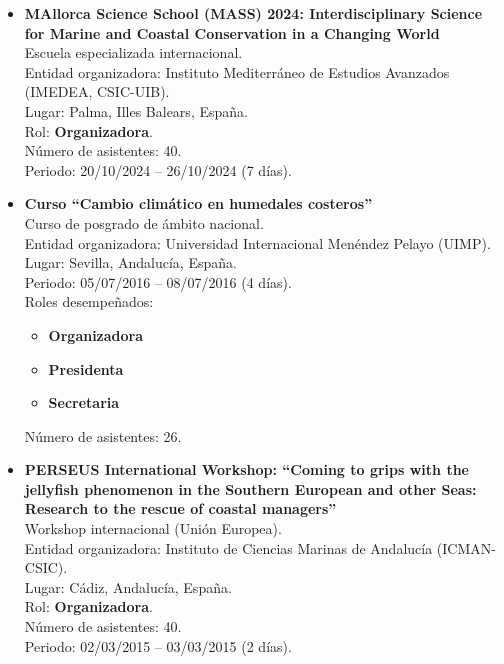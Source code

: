 \documentclass[11pt,a4paper]{article}
\begin{document}
\begin{itemize}[leftmargin=*]

    \item \textbf{MAllorca Science School (MASS) 2024: Interdisciplinary Science for Marine and Coastal Conservation in a Changing World}\\
    Escuela especializada internacional.\\
    Entidad organizadora: Instituto Mediterráneo de Estudios Avanzados (IMEDEA, CSIC-UIB).\\
    Lugar: Palma, Illes Balears, España.\\
    Rol: \textbf{Organizadora}.\\
    Número de asistentes: 40.\\
    Periodo: 20/10/2024 -- 26/10/2024 (7 días).

    \item \textbf{Curso ``Cambio climático en humedales costeros''}\\
    Curso de posgrado de ámbito nacional.\\
    Entidad organizadora: Universidad Internacional Menéndez Pelayo (UIMP).\\
    Lugar: Sevilla, Andalucía, España.\\
    Periodo: 05/07/2016 -- 08/07/2016 (4 días).\\
    Roles desempeñados:
    \begin{itemize}
        \item \textbf{Organizadora}
        \item \textbf{Presidenta}
        \item \textbf{Secretaria}
    \end{itemize}
    Número de asistentes: 26.

    \item \textbf{PERSEUS International Workshop: ``Coming to grips with the jellyfish phenomenon in the Southern European and other Seas: Research to the rescue of coastal managers''}\\
    Workshop internacional (Unión Europea).\\
    Entidad organizadora: Instituto de Ciencias Marinas de Andalucía (ICMAN-CSIC).\\
    Lugar: Cádiz, Andalucía, España.\\
    Rol: \textbf{Organizadora}.\\
    Número de asistentes: 40.\\
    Periodo: 02/03/2015 -- 03/03/2015 (2 días).


\end{itemize}
\end{document}
